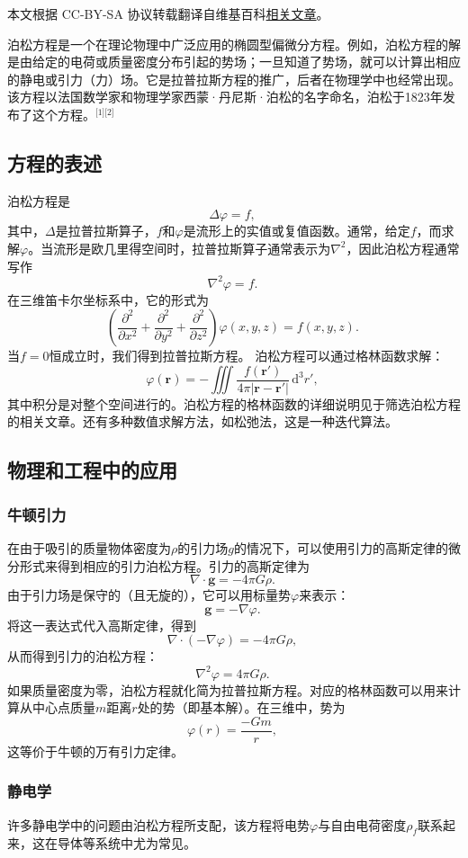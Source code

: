 
本文根据 CC-BY-SA 协议转载翻译自维基百科\href{https://en.wikipedia.org/wiki/Poisson\%27s_equation}{相关文章}。

泊松方程是一个在理论物理中广泛应用的椭圆型偏微分方程。例如，泊松方程的解是由给定的电荷或质量密度分布引起的势场；一旦知道了势场，就可以计算出相应的静电或引力（力）场。它是拉普拉斯方程的推广，后者在物理学中也经常出现。该方程以法国数学家和物理学家西蒙·丹尼斯·泊松的名字命名，泊松于1823年发布了这个方程。\(^\text{[1][2]}\)
\subsection{方程的表述}  
泊松方程是  
\[
\Delta \varphi = f,~
\]
其中，\(\Delta\)是拉普拉斯算子，\(f\)和\(\varphi\)是流形上的实值或复值函数。通常，给定\(f\)，而求解\(\varphi\)。当流形是欧几里得空间时，拉普拉斯算子通常表示为\(\nabla^2\)，因此泊松方程通常写作  
\[
\nabla^2 \varphi = f.~
\]
在三维笛卡尔坐标系中，它的形式为  
\[
\left( \frac{\partial^2}{\partial x^2} + \frac{\partial^2}{\partial y^2} + \frac{\partial^2}{\partial z^2} \right) \varphi (x, y, z) = f (x, y, z).~
\]
当\(f = 0\)恒成立时，我们得到拉普拉斯方程。
泊松方程可以通过格林函数求解：  
\[
\varphi(\mathbf{r}) = - \iiint \frac{f(\mathbf{r'})}{4 \pi |\mathbf{r} - \mathbf{r'}|} \, \mathrm{d}^3 r',~
\]
其中积分是对整个空间进行的。泊松方程的格林函数的详细说明见于筛选泊松方程的相关文章。还有多种数值求解方法，如松弛法，这是一种迭代算法。
\subsection{物理和工程中的应用}  
\subsubsection{牛顿引力}   
在由于吸引的质量物体密度为\(\rho\)的引力场\(g\)的情况下，可以使用引力的高斯定律的微分形式来得到相应的引力泊松方程。引力的高斯定律为  
\[
\nabla \cdot \mathbf{g} = -4\pi G \rho.~
\]
由于引力场是保守的（且无旋的），它可以用标量势\(\varphi\)来表示：  
\[
\mathbf{g} = - \nabla \varphi.~
\]
将这一表达式代入高斯定律，得到  
\[
\nabla \cdot (-\nabla \varphi) = -4\pi G \rho,~
\]  
从而得到引力的泊松方程：  
\[
\nabla^2 \varphi = 4\pi G \rho.~
\]
如果质量密度为零，泊松方程就化简为拉普拉斯方程。对应的格林函数可以用来计算从中心点质量\(m\)距离\(r\)处的势（即基本解）。在三维中，势为  
\[
\varphi (r) = \frac{-Gm}{r},~
\]  
这等价于牛顿的万有引力定律。
\subsubsection{静电学}
许多静电学中的问题由泊松方程所支配，该方程将电势\(\varphi\)与自由电荷密度\(\rho_f\)联系起来，这在导体等系统中尤为常见。

